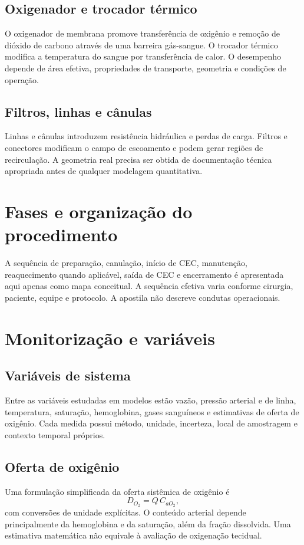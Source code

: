 \documentclass[11pt,a4paper,oneside]{book}
\begin{document}
\section{Oxigenador e trocador térmico}
O oxigenador de membrana promove transferência de oxigênio e remoção de dióxido de carbono através de uma barreira gás-sangue. O trocador térmico modifica a temperatura do sangue por transferência de calor. O desempenho depende de área efetiva, propriedades de transporte, geometria e condições de operação.

\section{Filtros, linhas e cânulas}
Linhas e cânulas introduzem resistência hidráulica e perdas de carga. Filtros e conectores modificam o campo de escoamento e podem gerar regiões de recirculação. A geometria real precisa ser obtida de documentação técnica apropriada antes de qualquer modelagem quantitativa.

\chapter{Fases e organização do procedimento}
A sequência de preparação, canulação, início de CEC, manutenção, reaquecimento quando aplicável, saída de CEC e encerramento é apresentada aqui apenas como mapa conceitual. A sequência efetiva varia conforme cirurgia, paciente, equipe e protocolo. A apostila não descreve condutas operacionais.

\chapter{Monitorização e variáveis}
\section{Variáveis de sistema}
Entre as variáveis estudadas em modelos estão vazão, pressão arterial e de linha, temperatura, saturação, hemoglobina, gases sanguíneos e estimativas de oferta de oxigênio. Cada medida possui método, unidade, incerteza, local de amostragem e contexto temporal próprios.

\section{Oferta de oxigênio}
Uma formulação simplificada da oferta sistêmica de oxigênio é
\[
D_{O_2}=Q\,C_{aO_2},
\]
com conversões de unidade explícitas. O conteúdo arterial depende principalmente da hemoglobina e da saturação, além da fração dissolvida. Uma estimativa matemática não equivale à avaliação de oxigenação tecidual.
\end{document}
